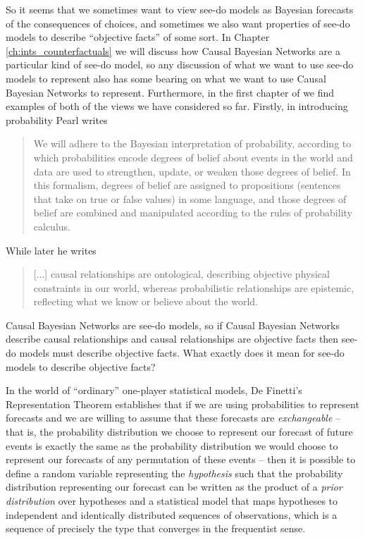 So it seems that we sometimes want to view see-do models as Bayesian forecasts of the consequences of choices, and sometimes we also want properties of see-do models to describe ``objective facts'' of some sort. In Chapter \ref{ch:ints_counterfactuals} we will discuss how Causal Bayesian Networks are a particular kind of see-do model, so any discussion of what we want to use see-do models to represent also has some bearing on what we want to use Causal Bayesian Networks to represent. Furthermore, in the first chapter of \citet{pearl_causality:_2009} we find examples of both of the views we have considered so far. Firstly, in introducing probability Pearl writes

\begin{quote}
We will adhere to the Bayesian interpretation of probability, according to which probabilities encode degrees of belief about events in the world and data are used to strengthen, update, or weaken those degrees of belief. In this formalism, degrees of belief are assigned to propositions (sentences that take on true or false values) in some language, and those degrees of belief are combined and manipulated according to the rules of probability calculus.
\end{quote}

While later he writes

\begin{quote}
[...] causal relationships are ontological, describing objective physical constraints in our world, whereas probabilistic relationships are epistemic, reflecting what we know or believe about the world.
\end{quote}

Causal Bayesian Networks are see-do models, so if Causal Bayesian Networks describe causal relationships and causal relationships are objective facts then see-do models must describe objective facts. What exactly does it mean for see-do models to describe objective facts?

In the world of ``ordinary'' one-player statistical models, De Finetti's Representation Theorem establishes that if we are using probabilities to represent forecasts and we are willing to assume that these forecasts are \emph{exchangeable} -- that is, the probability distribution we choose to represent our forecast of future events is exactly the same as the probability distribution we would choose to represent our forecasts of any permutation of these events -- then it is possible to define a random variable representing the \emph{hypothesis} such that the probability distribution representing our forecast can be written as the product of a \emph{prior distribution} over hypotheses and a statistical model that maps hypotheses to independent and identically distributed sequences of observations, which is a sequence of precisely the type that converges in the frequentist sense.

